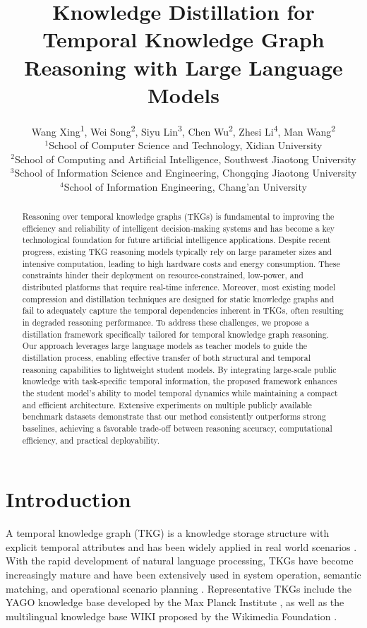 \documentclass[11pt]{article}
\title{Knowledge Distillation for Temporal Knowledge Graph Reasoning with Large Language Models}
\author{Wang Xing\textsuperscript{1},
Wei Song\textsuperscript{2}, 
Siyu Lin\textsuperscript{3},
Chen Wu\textsuperscript{2}, 
Zhesi Li\textsuperscript{4}, 
Man Wang\textsuperscript{2} \\
$^1$School of Computer Science and Technology, Xidian University\\ 
$^2$School of Computing and Artificial Intelligence, Southwest Jiaotong University\\
$^3$School of Information Science and Engineering, Chongqing Jiaotong University\\
$^4$School of Information Engineering, Chang'an University\\
}
\begin{document}
\maketitle
\begin{abstract}
Reasoning over temporal knowledge graphs (TKGs) is fundamental to improving the efficiency and reliability of intelligent decision-making systems and has become a key technological foundation for future artificial intelligence applications. Despite recent progress, existing TKG reasoning models typically rely on large parameter sizes and intensive computation, leading to high hardware costs and energy consumption. These constraints hinder their deployment on resource-constrained, low-power, and distributed platforms that require real-time inference. Moreover, most existing model compression and distillation techniques are designed for static knowledge graphs and fail to adequately capture the temporal dependencies inherent in TKGs, often resulting in degraded reasoning performance.
To address these challenges, we propose a distillation framework specifically tailored for temporal knowledge graph reasoning. Our approach leverages large language models as teacher models to guide the distillation process, enabling effective transfer of both structural and temporal reasoning capabilities to lightweight student models. By integrating large-scale public knowledge with task-specific temporal information, the proposed framework enhances the student model’s ability to model temporal dynamics while maintaining a compact and efficient architecture. Extensive experiments on multiple publicly available benchmark datasets demonstrate that our method consistently outperforms strong baselines, achieving a favorable trade-off between reasoning accuracy, computational efficiency, and practical deployability.

\end{abstract}

\section{Introduction}

A temporal knowledge graph (TKG) is a knowledge storage structure with explicit temporal attributes and has been widely applied in real world scenarios \citep{leblay2018deriving, kazemi2020representation}. With the rapid development of natural language processing, TKGs have become increasingly mature and have been extensively used in system operation, semantic matching, and operational scenario planning \citep{garcia2020temporal}. Representative TKGs include the YAGO knowledge base developed by the Max Planck Institute \citep{mahdisoltani2015yago3}, as well as the multilingual knowledge base WIKI proposed by the Wikimedia Foundation \citep{vrandevcic2014wikidata}.
\end{document}
